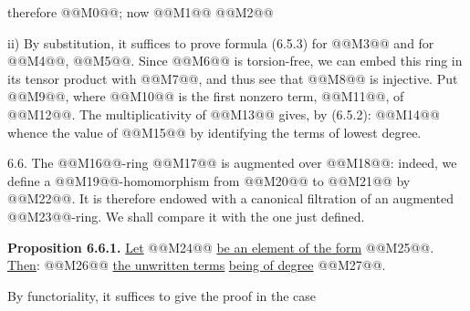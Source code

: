 therefore @@M0@@; now @@M1@@
@@M2@@

ii) By substitution, it suffices to prove formula (6.5.3) for @@M3@@ and for @@M4@@, @@M5@@. Since @@M6@@ is torsion-free, we can embed this ring in its tensor product with @@M7@@, and thus see that @@M8@@ is injective. Put @@M9@@, where @@M10@@ is the first nonzero term, @@M11@@, of @@M12@@. The multiplicativity of @@M13@@ gives, by (6.5.2):
@@M14@@
whence the value of @@M15@@ by identifying the terms of lowest degree.

6.6. The @@M16@@-ring @@M17@@ is augmented over @@M18@@: indeed, we define a @@M19@@-homomorphism from @@M20@@ to @@M21@@ by @@M22@@. It is therefore endowed with a canonical filtration of an augmented @@M23@@-ring. We shall compare it with the one just defined.

\textbf{Proposition 6.6.1.} \uline{Let} @@M24@@ \uline{be an element of the form} @@M25@@. \uline{Then}:
@@M26@@
\uline{the unwritten terms} \uline{being of degree} @@M27@@.

By functoriality, it suffices to give the proof in the case
